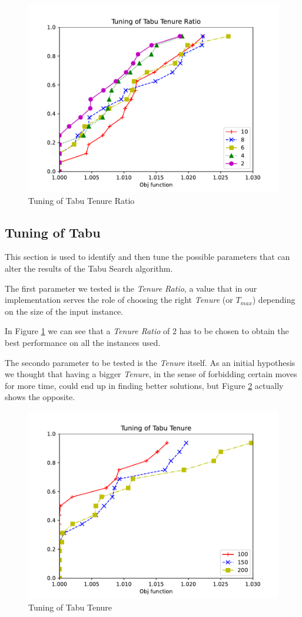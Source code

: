 \begin{figure}[!h]
    \centering
    \includegraphics[width=\textwidth]{images/tabu.pdf}
    \caption{Tuning of Tabu Tenure Ratio}
    \label{fig:tabu}
\end{figure}
\subsection{Tuning of Tabu}

This section is used to identify and then tune the possible parameters that can alter the results of the Tabu Search algorithm.



The first parameter we tested is the \textit{Tenure Ratio}, a value that in our implementation serves the role of choosing the right \textit{Tenure} (or $T_{max}$) depending on the size of the input instance.

In Figure \ref{fig:tabu} we can see that a \textit{Tenure Ratio} of 2 has to be chosen to obtain the best performance on all the instances used.



The secondo parameter to be tested is the \textit{Tenure} itself. As an initial hypothesis we thought that having a bigger \textit{Tenure}, in the sense of forbidding certain moves for more time, could end up in finding better solutions, but Figure \ref{fig:tabu2} actually shows the opposite.

\begin{figure}[!h]
    \centering
    \includegraphics[width=\textwidth]{images/tabu2.pdf}
    \caption{Tuning of Tabu Tenure}
    \label{fig:tabu2}
\end{figure}